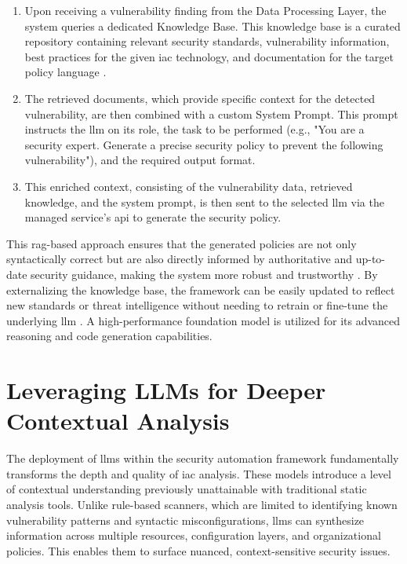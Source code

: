 \begin{enumerate}
\item Upon receiving a vulnerability finding from the Data Processing Layer, the system queries a dedicated Knowledge Base. This knowledge base is a curated repository containing relevant security standards, vulnerability information, best practices for the given \gls{iac} technology, and documentation for the target policy language \cite{ozgur_simple_2024}.
\item The retrieved documents, which provide specific context for the detected vulnerability, are then combined with a custom System Prompt. This prompt instructs the \gls{llm} on its role, the task to be performed (e.g., "You are a security expert. Generate a precise security policy to prevent the following vulnerability"), and the required output format.
\item This enriched context, consisting of the vulnerability data, retrieved knowledge, and the system prompt, is then sent to the selected \gls{llm} via the managed service's \gls{api} to generate the security policy.
\end{enumerate}

This \gls{rag}-based approach ensures that the generated policies are not only syntactically correct but are also directly informed by authoritative and up-to-date security guidance, making the system more robust and trustworthy \cite{noauthor_ground_nodate}. By externalizing the knowledge base, the framework can be easily updated to reflect new standards or threat intelligence without needing to retrain or fine-tune the underlying \gls{llm} \cite{ozgur_simple_2024}. A high-performance foundation model is utilized for its advanced reasoning and code generation capabilities.


\section{Leveraging LLMs for Deeper Contextual Analysis} %
\label{sec:Leveraging LLMs for Deeper Contextual Analysis}

The deployment of \glspl{llm} within the security automation framework fundamentally transforms the depth and quality of \gls{iac} analysis. These models introduce a level of contextual understanding previously unattainable with traditional static analysis tools. Unlike rule-based scanners, which are limited to identifying known vulnerability patterns and syntactic misconfigurations, \glspl{llm} can synthesize information across multiple resources, configuration layers, and organizational policies. This enables them to surface nuanced, context-sensitive security issues.

